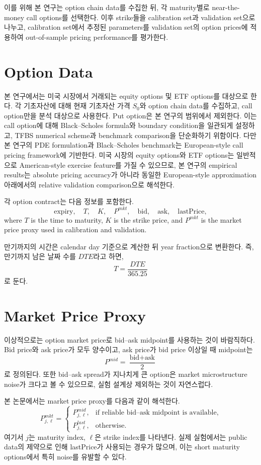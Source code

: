 \documentclass[11pt,a4paper]{report}
\begin{document}
이를 위해 본 연구는 option chain data를 수집한 뒤, 각 maturity별로 near-the-money call options를 선택한다. 이후 strike들을 calibration set과 validation set으로 나누고, calibration set에서 추정된 parameters를 validation set의 option prices에 적용하여 out-of-sample pricing performance를 평가한다.

\section{Option Data}

본 연구에서는 미국 시장에서 거래되는 equity options 및 ETF options를 대상으로 한다. 각 기초자산에 대해 현재 기초자산 가격 $S_0$와 option chain data를 수집하고, call option만을 분석 대상으로 사용한다. Put option은 본 연구의 범위에서 제외한다. 이는 call option에 대해 Black--Scholes formula와 boundary condition을 일관되게 설정하고, TFBS numerical scheme과 benchmark comparison을 단순화하기 위함이다. 다만 본 연구의 PDE formulation과 Black--Scholes benchmark는 European-style call pricing framework에 기반한다. 미국 시장의 equity options와 ETF options는 일반적으로 American-style exercise feature를 가질 수 있으므로, 본 연구의 empirical results는 absolute pricing accuracy가 아니라 동일한 European-style approximation 아래에서의 relative validation comparison으로 해석한다.

각 option contract는 다음 정보를 포함한다.
\[
\text{expiry},\quad T,\quad K,\quad P^{mkt},\quad \text{bid},\quad \text{ask},\quad \text{lastPrice},
\]
where $T$ is the time to maturity, $K$ is the strike price, and $P^{mkt}$ is the market price proxy used in calibration and validation.

만기까지의 시간은 calendar day 기준으로 계산한 뒤 year fraction으로 변환한다. 즉, 만기까지 남은 날짜 수를 $DTE$라고 하면,
\[
T = \frac{DTE}{365.25}
\]
로 둔다.

\section{Market Price Proxy}

이상적으로는 option market price로 bid--ask midpoint를 사용하는 것이 바람직하다. Bid price와 ask price가 모두 양수이고, ask price가 bid price 이상일 때 midpoint는
\[
P^{mid}
=
\frac{\text{bid}+\text{ask}}{2}
\]
로 정의된다. 또한 bid--ask spread가 지나치게 큰 option은 market microstructure noise가 크다고 볼 수 있으므로, 실험 설계상 제외하는 것이 자연스럽다.

본 논문에서는 market price proxy를 다음과 같이 해석한다.
\[
P^{mkt}_{j,\ell}
=
\begin{cases}
P^{mid}_{j,\ell}, & \text{if reliable bid--ask midpoint is available},\\
P^{last}_{j,\ell}, & \text{otherwise}.
\end{cases}
\]
여기서 $j$는 maturity index, $\ell$은 strike index를 나타낸다. 실제 실험에서는 public data의 제약으로 인해 lastPrice가 사용되는 경우가 많으며, 이는 short maturity options에서 특히 noise를 유발할 수 있다.
\end{document}
